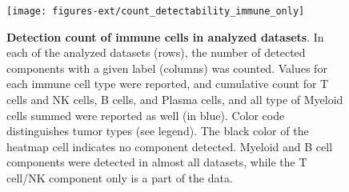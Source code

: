 \documentclass[12pt,]{book}
\theoremstyle{definition}
\theoremstyle{definition}
\theoremstyle{definition}
\theoremstyle{remark}
\begin{document}
\begin{figure}

{\centering \texttt{[image: figures-ext/count\_detectability\_immune\_only]} 

}

\caption[Detection count of immune cells in analyzed datasets]{\textbf{Detection count of immune cells in
analyzed datasets}. In each of the analyzed datasets (rows), the number
of detected components with a given label (columns) was counted. Values
for each immune cell type were reported, and cumulative count for T
cells and NK cells, B cells, and Plasma cells, and all type of Myeloid
cells summed were reported as well (in blue). Color code distinguishes
tumor types (see legend). The black color of the heatmap cell indicates
no component detected. Myeloid and B cell components were detected in
almost all datasets, while the T cell/NK component only is a part of the
data.}\label{fig:countdectect}
\end{figure}
\end{document}
